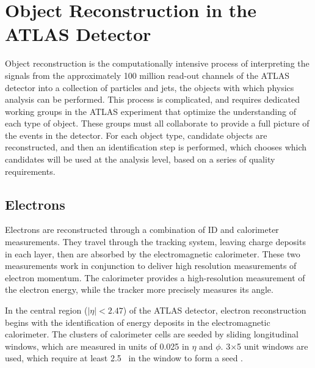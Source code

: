 \chapter{Object Reconstruction in the ATLAS Detector} %
\label{ch:reconstruction} 

Object reconstruction is the computationally intensive process of interpreting the signals from the approximately 100 million read-out channels of the \ac{ATLAS} detector into a collection of particles and jets, the objects with which physics analysis can be performed. This process is complicated, and requires dedicated working groups in the \ac{ATLAS} experiment that optimize the understanding of each type of object. These groups must all collaborate to provide a full picture of the events in the detector. For each object type, candidate objects are reconstructed, and then an identification step is performed, which chooses which candidates will be used at the analysis level, based on a series of quality requirements.


\section{Electrons}
\label{sec:reco_electrons}

Electrons are reconstructed through a combination of \ac{ID} and calorimeter measurements. They travel through the tracking system, leaving charge deposits in each layer, then are absorbed by the electromagnetic calorimeter. These two measurements work in conjunction to deliver high resolution measurements of electron momentum. The calorimeter provides a high-resolution measurement of the electron energy, while the tracker more precisely measures its angle.  %

In the central region ($|\eta|<2.47$) of the \ac{ATLAS} detector, electron reconstruction begins with the identification of energy deposits in the electromagnetic calorimeter. The clusters of calorimeter cells are seeded by sliding longitudinal windows, which are measured in units of 0.025 in $\eta$ and $\phi$. 3$\times$5 unit windows are used, which require at least 2.5 \gev~in the window to form a seed \cite{Aad:2011mk}. 

